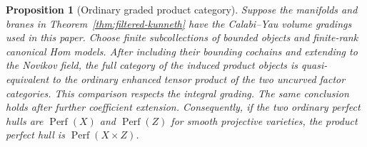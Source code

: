\documentclass[11pt]{article}
\numberwithin{equation}{section}
\newtheorem{proposition}[theorem]{Proposition}
\theoremstyle{definition}
\theoremstyle{remark}
\newcommand{\Perf}{\operatorname{Perf}}
\begin{document}
\begin{proposition}[Ordinary graded product category]
\label{prop:ordinary-kunneth}
Suppose the manifolds and branes in
Theorem~\ref{thm:filtered-kunneth} have the Calabi--Yau volume
gradings used in this paper.  Choose finite subcollections of
bounded objects and finite-rank canonical Hom models.  After
including their bounding cochains and extending to the Novikov
field, the full category of the induced product objects is
quasi-equivalent to the ordinary enhanced tensor product of
the two uncurved factor categories.  This comparison respects
the integral grading.  The same conclusion holds after further
coefficient extension.  Consequently, if the two ordinary
perfect hulls are $\Perf(X)$ and $\Perf(Z)$ for smooth projective
varieties, the product perfect hull is $\Perf(X\times Z)$.
\end{proposition}
\end{document}
